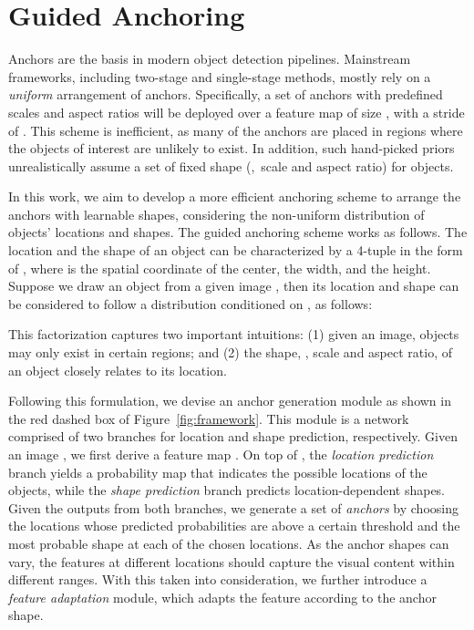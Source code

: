 \documentclass[10pt,twocolumn,letterpaper]{article}
\begin{document}
\section{Guided Anchoring}
\label{sec:methodology}




Anchors are the basis in modern object detection pipelines. Mainstream
frameworks, including two-stage and single-stage methods,
mostly rely on a \emph{uniform} arrangement of anchors.
Specifically, a set of anchors with predefined scales and aspect ratios
will be deployed over a feature map of size , with a stride of
. This scheme is inefficient, as many of the anchors are placed in
regions where the objects of interest are unlikely to exist.
In addition, such hand-picked priors unrealistically assume a set of fixed shape
(\ie,~scale and aspect ratio) for objects.



In this work, we aim to develop a more efficient anchoring scheme to arrange the anchors with learnable shapes,
considering the non-uniform distribution of objects' locations and shapes.
The guided anchoring scheme works as follows.
The location and the shape of an object can be characterized by a 4-tuple
in the form of ,
where  is the spatial coordinate of the center,  the width,
and  the height. Suppose we draw an object from a given image , then
its location and shape can be considered to follow a distribution conditioned
on , as follows:

This factorization captures two important intuitions:
(1) given an image, objects may only exist in certain regions; and
(2) the shape, \ie, scale and aspect ratio, of an object closely relates to
its location.



Following this formulation, we devise an anchor generation module
as shown in the red dashed box of Figure~\ref{fig:framework}. This module
is a network comprised of two branches for location
and shape prediction, respectively.
Given an image , we first derive a feature map . On top of ,
the \emph{location prediction} branch yields a probability map that indicates
the possible locations of the objects, while the \emph{shape prediction}
branch predicts location-dependent shapes.
Given the outputs from both branches, we generate a set of \emph{anchors} by
choosing the locations whose predicted probabilities are above a certain threshold
and the most probable shape at each of the chosen locations.
As the anchor shapes can vary, the features at different locations should
capture the visual content within different ranges.
With this taken into consideration, we further introduce a
\emph{feature adaptation} module, which adapts the feature according to the anchor shape.
\end{document}
